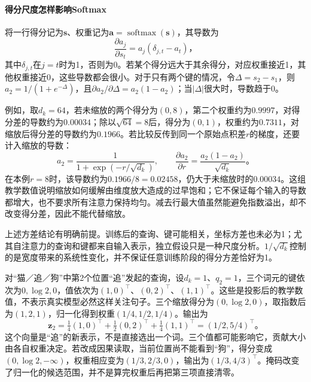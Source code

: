 \paragraph{得分尺度怎样影响Softmax}
将一行得分记为$\bm s$、权重记为$\bm a=\operatorname{softmax}(\bm s)$，其导数为
\begin{equation}
  \frac{\partial a_j}{\partial s_t}
      =a_j(\delta_{j,t}-a_t)\text{，}
  \label{eq:transformer-softmax-scale-gradient}
\end{equation}
其中$\delta_{j,t}$在$j=t$时为1，否则为0。若某个得分远大于其余得分，对应权重接近1，其他权重接近0，这些导数都会很小。对于只有两个键的情况，令$\Delta=s_2-s_1$，则$a_2=1/(1+e^{-\Delta})$，且$\partial a_2/\partial\Delta=a_2(1-a_2)$；当$|\Delta|$很大时，导数趋于0。

例如，取$d_k=64$，若未缩放的两个得分为$(0,8)$，第二个权重约为$0.9997$，对得分差的导数约为$0.00034$；除以$\sqrt{64}=8$后，得分为$(0,1)$，权重约为$0.7311$，对缩放后得分差的导数约为$0.1966$。若比较反传到同一个原始点积差$r$的梯度，还要计入缩放的导数：
\[
  a_2=\frac{1}{1+\exp(-r/\sqrt{d_k})},\qquad
  \frac{\partial a_2}{\partial r}
    =\frac{a_2(1-a_2)}{\sqrt{d_k}}\text{。}
\]
在本例$r=8$时，该导数约为$0.1966/8=0.02458$，仍大于未缩放时的$0.00034$。这组教学数值说明缩放如何缓解由维度放大造成的过早饱和；它不保证每个输入的导数都增大，也不要求所有注意力保持均匀。减去行最大值虽然能避免指数溢出，却不改变得分差，因此不能代替缩放。

上述方差结论有明确前提。训练后的查询、键可能相关，坐标方差也未必为1；尤其自注意力的查询和键都来自输入表示，独立假设只是一种尺度分析。$1/\sqrt{d_k}$控制的是宽度带来的系统性变化，并不保证任意训练阶段的得分方差恰好为1。

\begin{example}[同一查询在不同可见范围内的读取]
  \label{ex:transformer-attention-numerical}
  对“猫／追／狗”中第2个位置“追”发起的查询，设$d_k=1$、$q_2=1$，三个词元的键依次为$0,\log2,0$，值依次为$(1,0)^{\top}$、$(0,2)^{\top}$、$(1,1)^{\top}$。这些是投影后的教学数值，不表示真实模型必然这样关注句子。三个缩放得分为$(0,\log2,0)$，取指数后为$(1,2,1)$，归一化得到权重$(1/4,1/2,1/4)$。输出为
  \[
    \bm z_2=\tfrac14(1,0)^{\top}+\tfrac12(0,2)^{\top}
                    +\tfrac14(1,1)^{\top}
             =(1/2,5/4)^{\top}\text{。}
  \]
  这个向量是“追”的新表示，不是直接选出一个词。三个值都可能影响它，贡献大小由各自权重决定。若改成因果读取，当前位置尚不能看到“狗”，得分变成$(0,\log2,-\infty)$，权重相应变为$(1/3,2/3,0)$，输出为$(1/3,4/3)^{\top}$。掩码改变了归一化的候选范围，并不是算完权重后再把第三项直接清零。
\end{example}

